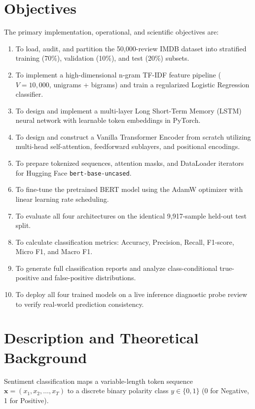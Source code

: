 \section{Objectives}
The primary implementation, operational, and scientific objectives are:
\begin{enumerate}[label=\textbf{\arabic*.}]
    \item To load, audit, and partition the 50,000-review IMDB dataset into stratified training (70\%), validation (10\%), and test (20\%) subsets.
    \item To implement a high-dimensional n-gram TF-IDF feature pipeline ($V = 10,000$, unigrams + bigrams) and train a regularized Logistic Regression classifier.
    \item To design and implement a multi-layer Long Short-Term Memory (LSTM) neural network with learnable token embeddings in PyTorch.
    \item To design and construct a Vanilla Transformer Encoder from scratch utilizing multi-head self-attention, feedforward sublayers, and positional encodings.
    \item To prepare tokenized sequences, attention masks, and DataLoader iterators for Hugging Face \texttt{bert-base-uncased}.
    \item To fine-tune the pretrained BERT model using the AdamW optimizer with linear learning rate scheduling.
    \item To evaluate all four architectures on the identical 9,917-sample held-out test split.
    \item To calculate classification metrics: Accuracy, Precision, Recall, F1-score, Micro F1, and Macro F1.
    \item To generate full classification reports and analyze class-conditional true-positive and false-positive distributions.
    \item To deploy all four trained models on a live inference diagnostic probe review to verify real-world prediction consistency.
\end{enumerate}

\section{Description and Theoretical Background}
Sentiment classification maps a variable-length token sequence $\mathbf{x} = (x_1, x_2, \dots, x_T)$ to a discrete binary polarity class $y \in \{0, 1\}$ (0 for Negative, 1 for Positive).

